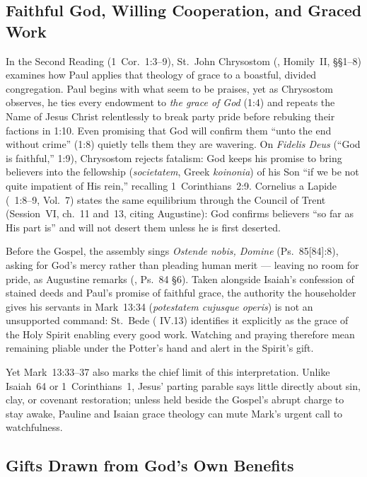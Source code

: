 \subsection{Faithful God, Willing Cooperation, and Graced Work}

In the Second Reading (1~Cor.~1:3--9), St.~John Chrysostom (, Homily~II, §§1--8) examines how Paul applies that theology of grace to a boastful, divided congregation. Paul begins with what seem to be praises, yet as Chrysostom observes, he ties every endowment to \emph{the grace of God} (1:4) and repeats the Name of Jesus Christ relentlessly to break party pride before rebuking their factions in 1:10. Even promising that God will confirm them ``unto the end without crime'' (1:8) quietly tells them they are wavering. On \emph{Fidelis Deus} (``God is faithful,'' 1:9), Chrysostom rejects fatalism: God keeps his promise to bring believers into the fellowship (\emph{societatem}, Greek \emph{koinonia}) of his Son ``if we be not quite impatient of His rein,'' recalling 1~Corinthians~2:9. Cornelius a Lapide (~1:8--9, Vol.~7) states the same equilibrium through the Council of Trent (Session~VI, ch.~11 and~13, citing Augustine): God confirms believers ``so far as His part is'' and will not desert them unless he is first deserted.

Before the Gospel, the assembly sings \emph{Ostende nobis, Domine} (Ps.~85[84]:8), asking for God's mercy rather than pleading human merit --- leaving no room for pride, as Augustine remarks (, Ps.~84 §6). Taken alongside Isaiah's confession of stained deeds and Paul's promise of faithful grace, the authority the householder gives his servants in Mark~13:34 (\emph{potestatem cujusque operis}) is not an unsupported command: St.~Bede ( IV.13) identifies it explicitly as the grace of the Holy Spirit enabling every good work. Watching and praying therefore mean remaining pliable under the Potter's hand and alert in the Spirit's gift.

Yet Mark~13:33--37 also marks the chief limit of this interpretation. Unlike Isaiah~64 or 1~Corinthians~1, Jesus' parting parable says little directly about sin, clay, or covenant restoration; unless held beside the Gospel's abrupt charge to stay awake, Pauline and Isaian grace theology can mute Mark's urgent call to watchfulness.

\subsection{Gifts Drawn from God's Own Benefits}

